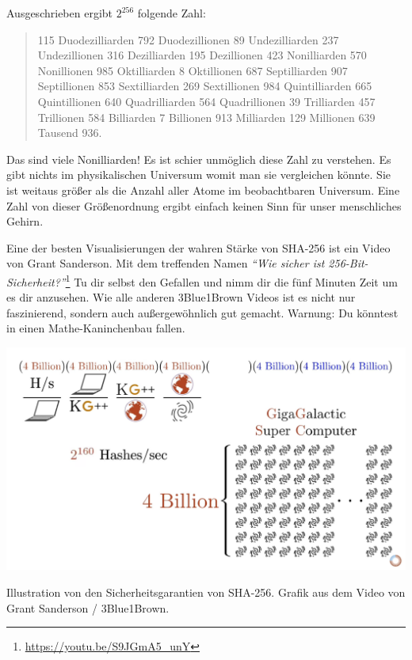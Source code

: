 Ausgeschrieben ergibt $2^{256}$ folgende Zahl:

\begin{quotation}\begin{samepage}
    115 Duodezilliarden 792 Duodezillionen 89 Undezilliarden 237 Undezillionen
    316 Dezilliarden 195 Dezillionen 423 Nonilliarden 570 Nonillionen 985
    Oktilliarden 8 Oktillionen 687 Septilliarden 907 Septillionen 853
    Sextilliarden 269 Sextillionen 984 Quintilliarden 665 Quintillionen 640
    Quadrilliarden 564 Quadrillionen 39 Trilliarden 457 Trillionen 584
    Billiarden 7 Billionen 913 Milliarden 129 Millionen 639 Tausend 936.
\end{samepage}\end{quotation}

Das sind viele Nonilliarden! Es ist schier unmöglich diese Zahl zu verstehen. Es
gibt nichts im physikalischen Universum womit man sie vergleichen könnte. Sie
ist weitaus größer als die Anzahl aller Atome im beobachtbaren Universum. Eine
Zahl von dieser Größenordnung ergibt einfach keinen Sinn für unser menschliches
Gehirn.

Eine der besten Visualisierungen der wahren Stärke von SHA-256 ist ein  Video
von Grant Sanderson. Mit dem treffenden Namen \textit{\enquote{Wie sicher ist
256-Bit-Sicherheit?}}\footnote{\url{https://youtu.be/S9JGmA5_unY}} Tu dir selbst
den Gefallen und nimm dir die fünf Minuten Zeit um es dir anzusehen. Wie alle
anderen 3Blue1Brown Videos ist es nicht nur faszinierend, sondern auch
außergewöhnlich gut gemacht. Warnung: Du könntest in einen Mathe-Kaninchenbau
fallen.

\begin{center}
  \includegraphics[width=\textwidth]{assets/images/youtube-vid-inverted.png}
  \caption{Illustration von den Sicherheitsgarantien von SHA-256. Grafik aus dem Video von Grant Sanderson / 3Blue1Brown.}
  \label{fig:youtube-vid-inverted}
\end{center}

